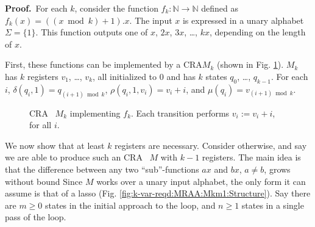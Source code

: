 \documentclass[11pt]{article}
\def\Proof{{\bf Proof.}}
\newcommand{\Fig}[1]{Fig. #1}
\newcommand{\EDWA}{{CRA}\xspace}
\newcommand{\edwa}{\ensuremath{M}}
\newcommand{\setof}[1]{\{#1\}}
\begin{document}
\Proof~For each $k$, consider the function
$f_{k}:\mathbb{N}\to\mathbb{N}$ defined as
$f_{k}\left(x\right)=\left((x\bmod k)+1\right).x$.  The input $x$ is
expressed in a unary alphabet $\Sigma=\setof{1} $.  This function
outputs one of $x$, $2x$, $3x$, \ldots{}, $kx$, depending on the
length of $x$.

First, these functions can be implemented by a \EDWA $\edwa_k$ (shown
in \Fig \ref{fig:k-var-reqd:MRAA:M_k}).  $\edwa_k$ has $k$ registers
$v_{1}$, \ldots{}, $v_{k}$, all initialized to $0$ and has $k$ states
$q_{0}$, \ldots{}, $q_{k-1}$.  For each $i$, $\delta(q_i,1) =
q_{(i+1)\bmod k}$, $\rho(q_i,1,v_i) = v_i + i$, and $\mu(q_i) =
v_{(i+1)\bmod k}$.

\begin{figure}
\begin{centering}
\par\end{centering}

\caption{\label{fig:k-var-reqd:MRAA:M_k}\EDWA~ $M_{k}$ implementing $f_{k}$.
Each transition performs $v_{i}:=v_{i}+i$, for all $i$.}
\end{figure}

We now show that at least $k$ registers are necessary. Consider
otherwise, and say we are able to produce such an \EDWA~ $M$ with
$k-1$ registers.  The main idea is that the difference between any two
{}``sub''-functions $ax$ and $bx$, $a\neq b$, grows without bound
Since $M$ works over a unary input
alphabet, the only form it can assume is that of a lasso (\Fig
\ref{fig:k-var-reqd:MRAA:Mkm1:Structure}). Say there are $m\geq0$
states in the initial approach to the loop, and $n\geq1$ states in a
single pass of the loop.
\end{document}
